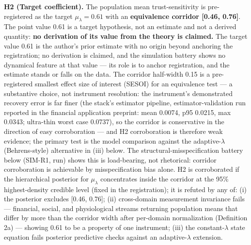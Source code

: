 \documentclass[
]{article}
\begin{document}
\textbf{H2 (Target coefficient).} The population mean trust-sensitivity
is pre-registered as the target \(\mu_\lambda = 0.61\) with an
\textbf{equivalence corridor {[}0.46, 0.76{]}}. The point value 0.61 is
a target hypothesis, not an estimate and not a derived quantity:
\textbf{no derivation of its value from the theory is claimed.} The
target value 0.61 is the author's prior estimate with no origin beyond
anchoring the registration; no derivation is claimed, and the simulation
battery shows no dynamical feature at that value --- its role is to
anchor registration, and the estimate stands or falls on the data. The
corridor half-width 0.15 is a pre-registered smallest effect size of
interest (SESOI) for an equivalence test --- a substantive choice, not
instrument resolution: the instrument's demonstrated recovery error is
far finer (the stack's estimator pipeline, estimator-validation run
reported in the financial application preprint: mean 0.0074, p95 0.0215,
max 0.0343; ultra-thin worst case 0.0737), so the corridor is
conservative in the direction of easy corroboration --- and H2
corroboration is therefore weak evidence; the primary test is the model
comparison against the adaptive-\(\lambda\) (Behrens-style) alternative
in (iii) below. The structural-misspecification battery below (SIM-R1,
run) shows this is load-bearing, not rhetorical: corridor corroboration
is achievable by misspecification bias alone. H2 is corroborated if the
hierarchical posterior for \(\mu_\lambda\) concentrates inside the
corridor at the 95\% highest-density credible level (fixed in the
registration); it is refuted by any of: (i) the posterior excludes
{[}0.46, 0.76{]}; (ii) cross-domain measurement invariance fails ---
financial, social, and physiological streams returning population means
that differ by more than the corridor width after per-domain
normalization (Definition 2a) --- showing 0.61 to be a property of one
instrument; (iii) the constant-\(\lambda\) state equation fails
posterior predictive checks against an adaptive-\(\lambda\) extension.
\end{document}
